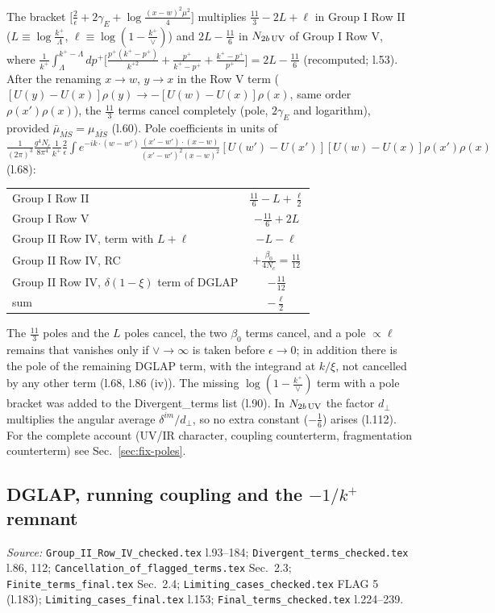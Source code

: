 \documentclass[10pt]{article}
\begin{document}
\noindent The bracket $\big[\frac{2}{\epsilon}+2\gamma_{E}+\log\frac{(x-w)^{2}\mu^{2}}{4}\big]$ multiplies $\frac{11}{3}-2L+\ell$ in Group I Row II ($L\equiv\log\frac{k^{+}}{\Lambda}$, $\ell\equiv\log(1-\frac{k^{+}}{\vee})$) and $2L-\frac{11}{6}$ in $N_{2b\,\rm UV}$ of Group I Row V, where $\frac{1}{k^{+}}\int_{\Lambda}^{k^{+}-\Lambda}dp^{+}\big[\frac{p^{+}(k^{+}-p^{+})}{k^{+2}}+\frac{p^{+}}{k^{+}-p^{+}}+\frac{k^{+}-p^{+}}{p^{+}}\big]=2L-\frac{11}{6}$ (recomputed; l.53). After the renaming $x\to w$, $y\to x$ in the Row V term ($[U(y)-U(x)]\rho(y)\to-[U(w)-U(x)]\rho(x)$, same order $\rho(x')\rho(x)$), the $\frac{11}{3}$ terms cancel completely (pole, $2\gamma_{E}$ and logarithm), provided $\bar\mu_{\overline{MS}}=\mu_{\overline{MS}}$ (l.60). Pole coefficients in units of $\frac{1}{(2\pi)^{3}}\frac{g^{4}N_{c}}{8\pi^{4}}\frac{1}{k^{+}}\frac{2}{\epsilon}\int e^{-ik\cdot(w-w')}\frac{(x'-w')\cdot(x-w)}{(x'-w')^{2}(x-w)^{2}}[U(w')-U(x')][U(w)-U(x)]\rho(x')\rho(x)$ (l.68):
\begin{center}
\begin{tabular}{lc}
\toprule
Group I Row II & $\frac{11}{6}-L+\frac{\ell}{2}$\\
Group I Row V & $-\frac{11}{6}+2L$\\
Group II Row IV, term with $L+\ell$ & $-L-\ell$\\
Group II Row IV, RC & $+\frac{\beta_{0}}{4N_{c}}=\frac{11}{12}$\\
Group II Row IV, $\delta(1-\xi)$ term of DGLAP & $-\frac{11}{12}$\\
\midrule
sum & $-\frac{\ell}{2}$\\
\bottomrule
\end{tabular}
\end{center}
The $\frac{11}{3}$ poles and the $L$ poles cancel, the two $\beta_{0}$ terms cancel, and a pole $\propto\ell$ remains that vanishes only if $\vee\to\infty$ is taken before $\epsilon\to0$; in addition there is the pole of the remaining DGLAP term, with the integrand at $k/\xi$, not cancelled by any other term (l.68, l.86 (iv)). The missing $\log(1-\frac{k^{+}}{\vee})$ term with a pole bracket was added to the Divergent\_terms list (l.90). In $N_{2b\,\rm UV}$ the factor $d_{\perp}$ multiplies the angular average $\delta^{im}/d_{\perp}$, so no extra constant ($-\frac16$) arises (l.112). For the complete account (UV/IR character, coupling counterterm, fragmentation counterterm) see Sec.~\ref{sec:fix-poles}.

\subsection{DGLAP, running coupling and the $-1/k^{+}$ remnant}\label{sec:calc-dglap}
\noindent\emph{Source:} \texttt{Group\_II\_Row\_IV\_checked.tex} l.93--184; \texttt{Divergent\_terms\_checked.tex} l.86, 112; \texttt{Cancellation\_of\_flagged\_terms.tex} Sec.~2.3; \texttt{Finite\_terms\_final.tex} Sec.~2.4; \texttt{Limiting\_cases\_checked.tex} FLAG 5 (l.183); \texttt{Limiting\_cases\_final.tex} l.153; \texttt{Final\_terms\_checked.tex} l.224--239.
\end{document}
